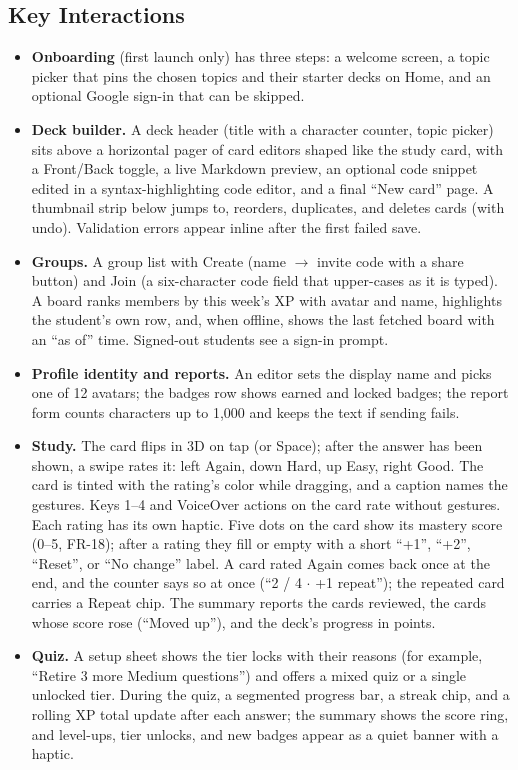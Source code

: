 \documentclass[12pt,letterpaper]{article}
\begin{document}
\subsection{Key Interactions}\label{sec:keyint}
\begin{itemize}
  \item \textbf{Onboarding} (first launch only) has three steps: a welcome screen,
        a topic picker that pins the chosen topics and their starter decks on Home,
        and an optional Google sign-in that can be skipped.
  \item \textbf{Deck builder.} A deck header (title with a character counter, topic
        picker) sits above a horizontal pager of card editors shaped like the study
        card, with a Front/Back toggle, a live Markdown preview, an optional code
        snippet edited in a syntax-highlighting code editor, and a final ``New card''
        page. A thumbnail strip below jumps to, reorders, duplicates, and deletes
        cards (with undo). Validation errors appear inline after the first failed save.
  \item \textbf{Groups.} A group list with Create (name $\to$ invite code with a share
        button) and Join (a six-character code field that upper-cases as it is typed).
        A board ranks members by this week's XP with avatar and name, highlights the
        student's own row, and, when offline, shows the last fetched board with an
        ``as of'' time. Signed-out students see a sign-in prompt.
  \item \textbf{Profile identity and reports.} An editor sets the display name and
        picks one of 12 avatars; the badges row shows earned and locked badges; the
        report form counts characters up to 1,000 and keeps the text if sending
        fails.
  \item \textbf{Study.} The card flips in 3D on tap (or Space); after the answer has
        been shown, a swipe rates it: left Again, down Hard, up Easy, right Good. The
        card is tinted with the rating's color while dragging, and a caption names the
        gestures. Keys 1--4 and VoiceOver actions on the card rate without gestures.
        Each rating has its own haptic. Five dots on the card show its mastery score
        (0--5, FR-18); after a rating they fill or empty with a short ``+1'', ``+2'',
        ``Reset'', or ``No change'' label. A card rated Again comes back once at the
        end, and the counter says so at once (``2 / 4 $\cdot$ +1 repeat''); the
        repeated card carries a Repeat chip. The summary reports the cards reviewed,
        the cards whose score rose (``Moved up''), and the deck's progress in points.
  \item \textbf{Quiz.} A setup sheet shows the tier locks with their reasons (for
        example, ``Retire 3 more Medium questions'') and offers a mixed quiz or a single
        unlocked tier. During the quiz, a segmented progress bar, a streak chip, and a
        rolling XP total update after each answer; the summary shows the score ring, and
        level-ups, tier unlocks, and new badges appear as a quiet banner with a
        haptic.
\end{itemize}
\end{document}
